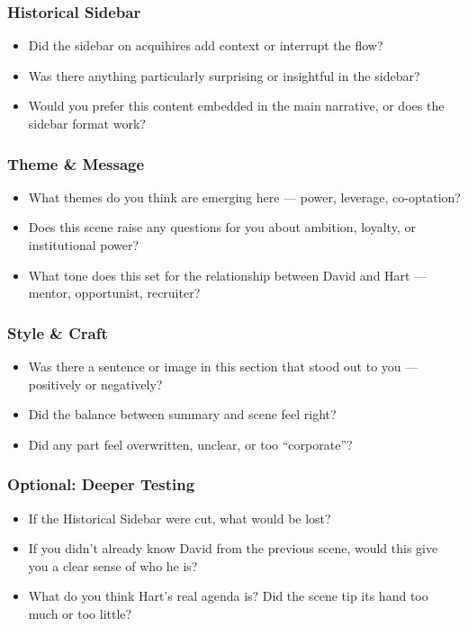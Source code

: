 \subsubsection{Historical Sidebar}

\begin{itemize}
  \item Did the sidebar on acquihires add context or interrupt the flow?
  \item Was there anything particularly surprising or insightful in the sidebar?
  \item Would you prefer this content embedded in the main narrative, or does the sidebar format work?
\end{itemize}

\subsubsection{Theme \& Message}

\begin{itemize}
  \item What themes do you think are emerging here — power, leverage, co-optation?
  \item Does this scene raise any questions for you about ambition, loyalty, or institutional power?
  \item What tone does this set for the relationship between David and Hart — mentor, opportunist, recruiter?
\end{itemize}

\subsubsection{Style \& Craft}

\begin{itemize}
  \item Was there a sentence or image in this section that stood out to you — positively or negatively?
  \item Did the balance between summary and scene feel right?
  \item Did any part feel overwritten, unclear, or too “corporate”?
\end{itemize}

\subsubsection{Optional: Deeper Testing}

\begin{itemize}
  \item If the Historical Sidebar were cut, what would be lost?
  \item If you didn’t already know David from the previous scene, would this give you a clear sense of who he is?
  \item What do you think Hart’s real agenda is? Did the scene tip its hand too much or too little?
\end{itemize}


